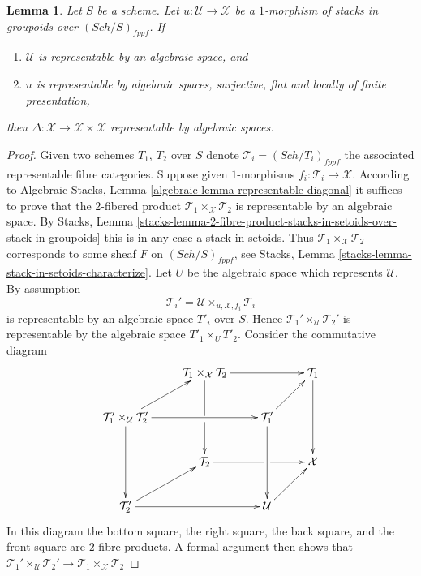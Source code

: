 \documentclass{stacks-project}
\theoremstyle{plain}
\newtheorem{lemma}[subsection]{Lemma}
\theoremstyle{definition}
\theoremstyle{remark}
\numberwithin{equation}{subsection}
\def\Sch{\mathit{Sch}}
\begin{document}
\begin{lemma}
\label{lemma-flat-finite-presentation-surjective-diagonal}
Let $S$ be a scheme.
Let $u : \mathcal{U} \to \mathcal{X}$ be a $1$-morphism of
stacks in groupoids over $(\Sch/S)_{fppf}$. If
\begin{enumerate}
\item $\mathcal{U}$ is representable by an algebraic space, and
\item $u$ is representable by algebraic spaces, surjective, flat and
locally of finite presentation,
\end{enumerate}
then
$\Delta : \mathcal{X} \to \mathcal{X} \times \mathcal{X}$
representable by algebraic spaces.
\end{lemma}

\begin{proof}
Given two schemes $T_1$, $T_2$ over $S$ denote
$\mathcal{T}_i = (\Sch/T_i)_{fppf}$ the associated representable
fibre categories. Suppose given $1$-morphisms
$f_i : \mathcal{T}_i \to \mathcal{X}$.
According to
Algebraic Stacks, Lemma \ref{algebraic-lemma-representable-diagonal}
it suffices to prove that the $2$-fibered
product $\mathcal{T}_1 \times_\mathcal{X} \mathcal{T}_2$
is representable by an algebraic space. By
Stacks, Lemma
\ref{stacks-lemma-2-fibre-product-stacks-in-setoids-over-stack-in-groupoids}
this is in any case a stack in setoids. Thus
$\mathcal{T}_1 \times_\mathcal{X} \mathcal{T}_2$ corresponds
to some sheaf $F$ on $(\Sch/S)_{fppf}$, see
Stacks, Lemma \ref{stacks-lemma-stack-in-setoids-characterize}.
Let $U$ be the algebraic space which represents $\mathcal{U}$.
By assumption
$$
\mathcal{T}_i' = \mathcal{U} \times_{u, \mathcal{X}, f_i} \mathcal{T}_i
$$
is representable by an algebraic space $T'_i$ over $S$. Hence
$\mathcal{T}_1' \times_\mathcal{U} \mathcal{T}_2'$ is representable
by the algebraic space $T'_1 \times_U T'_2$.
Consider the commutative diagram
$$
\xymatrix{
&
\mathcal{T}_1 \times_{\mathcal X} \mathcal{T}_2 \ar[rr]\ar'[d][dd] & &
\mathcal{T}_1 \ar[dd] \\
\mathcal{T}_1' \times_\mathcal{U} \mathcal{T}_2' \ar[ur]\ar[rr]\ar[dd] & &
\mathcal{T}_1' \ar[ur]\ar[dd] \\
&
\mathcal{T}_2 \ar'[r][rr] & &
\mathcal X \\
\mathcal{T}_2' \ar[rr]\ar[ur] & &
\mathcal{U} \ar[ur] }
$$
In this diagram the bottom square, the right square, the back square, and
the front square are $2$-fibre products. A formal argument then shows
that $\mathcal{T}_1' \times_\mathcal{U} \mathcal{T}_2' \to
\mathcal{T}_1 \times_{\mathcal X} \mathcal{T}_2$

\end{proof}
\end{document}
